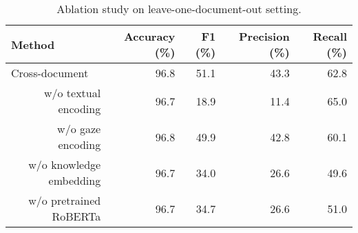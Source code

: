 \begin{table*}[]
\caption{Ablation study on leave-one-document-out setting.}
\label{tab:cross_doc_ablation}
\begin{tabular}{@{}rrrrr@{}}
\toprule
\multicolumn{1}{l}{Method}     & Accuracy (\%) & F1 (\%)   & Precision (\%) & Recall (\%) \\ \midrule
\multicolumn{1}{l}{Cross-document} & 96.8     & 51.1 & 43.3      & 62.8   \\ \midrule
w/o textual encoding        & 96.7        & 18.9    & 11.4        & 65.0   \\
w/o gaze encoding              & 96.8     & 49.9 & 42.8     & 60.1  \\
w/o knowledge embedding        & 96.7     & 34.0 & 26.6    &  49.6  \\
w/o pretrained RoBERTa        & 96.7     & 34.7 & 26.6    &  51.0  \\ \bottomrule
\end{tabular}
\end{table*}